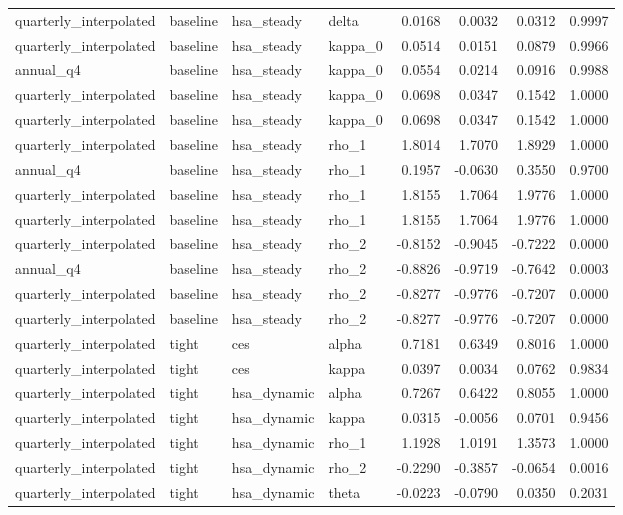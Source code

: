 \begin{tabular}{llllrrrr}
quarterly\_interpolated & baseline & hsa\_steady & delta & 0.0168 & 0.0032 & 0.0312 & 0.9997 \\
quarterly\_interpolated & baseline & hsa\_steady & kappa\_0 & 0.0514 & 0.0151 & 0.0879 & 0.9966 \\
annual\_q4 & baseline & hsa\_steady & kappa\_0 & 0.0554 & 0.0214 & 0.0916 & 0.9988 \\
quarterly\_interpolated & baseline & hsa\_steady & kappa\_0 & 0.0698 & 0.0347 & 0.1542 & 1.0000 \\
quarterly\_interpolated & baseline & hsa\_steady & kappa\_0 & 0.0698 & 0.0347 & 0.1542 & 1.0000 \\
quarterly\_interpolated & baseline & hsa\_steady & rho\_1 & 1.8014 & 1.7070 & 1.8929 & 1.0000 \\
annual\_q4 & baseline & hsa\_steady & rho\_1 & 0.1957 & -0.0630 & 0.3550 & 0.9700 \\
quarterly\_interpolated & baseline & hsa\_steady & rho\_1 & 1.8155 & 1.7064 & 1.9776 & 1.0000 \\
quarterly\_interpolated & baseline & hsa\_steady & rho\_1 & 1.8155 & 1.7064 & 1.9776 & 1.0000 \\
quarterly\_interpolated & baseline & hsa\_steady & rho\_2 & -0.8152 & -0.9045 & -0.7222 & 0.0000 \\
annual\_q4 & baseline & hsa\_steady & rho\_2 & -0.8826 & -0.9719 & -0.7642 & 0.0003 \\
quarterly\_interpolated & baseline & hsa\_steady & rho\_2 & -0.8277 & -0.9776 & -0.7207 & 0.0000 \\
quarterly\_interpolated & baseline & hsa\_steady & rho\_2 & -0.8277 & -0.9776 & -0.7207 & 0.0000 \\
quarterly\_interpolated & tight & ces & alpha & 0.7181 & 0.6349 & 0.8016 & 1.0000 \\
quarterly\_interpolated & tight & ces & kappa & 0.0397 & 0.0034 & 0.0762 & 0.9834 \\
quarterly\_interpolated & tight & hsa\_dynamic & alpha & 0.7267 & 0.6422 & 0.8055 & 1.0000 \\
quarterly\_interpolated & tight & hsa\_dynamic & kappa & 0.0315 & -0.0056 & 0.0701 & 0.9456 \\
quarterly\_interpolated & tight & hsa\_dynamic & rho\_1 & 1.1928 & 1.0191 & 1.3573 & 1.0000 \\
quarterly\_interpolated & tight & hsa\_dynamic & rho\_2 & -0.2290 & -0.3857 & -0.0654 & 0.0016 \\
quarterly\_interpolated & tight & hsa\_dynamic & theta & -0.0223 & -0.0790 & 0.0350 & 0.2031 \\

\end{tabular}
